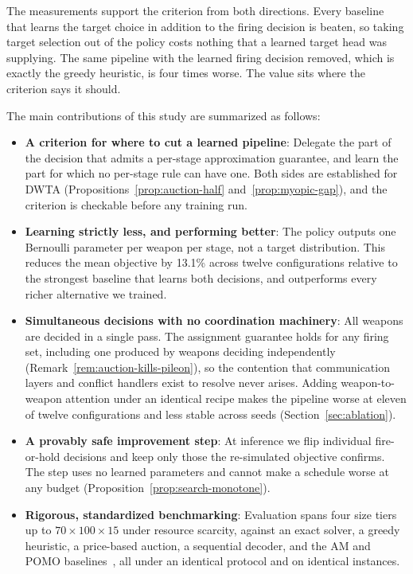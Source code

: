 The measurements support the criterion from both directions. Every baseline
that learns the target choice in addition to the firing decision is beaten, so
taking target selection out of the policy costs nothing that a learned target
head was supplying. The same pipeline with the learned firing decision
removed, which is exactly the greedy heuristic, is four times worse. The value
sits where the criterion says it should.

The main contributions of this study are summarized as follows:

\begin{itemize}
\item \textbf{A criterion for where to cut a learned pipeline}: Delegate the
part of the decision that admits a per-stage approximation guarantee, and
learn the part for which no per-stage rule can have one. Both sides are
established for DWTA (Propositions~\ref{prop:auction-half}
and~\ref{prop:myopic-gap}), and the criterion is checkable before any training
run.

\item \textbf{Learning strictly less, and performing better}: The policy
outputs one Bernoulli parameter per weapon per stage, not a target
distribution. This reduces the mean objective by 13.1\% across twelve
configurations relative to the strongest baseline that learns both decisions,
and outperforms every richer alternative we trained.

\item \textbf{Simultaneous decisions with no coordination machinery}: All
weapons are decided in a single pass. The assignment guarantee holds for any
firing set, including one produced by weapons deciding independently
(Remark~\ref{rem:auction-kills-pileon}), so the contention that communication
layers and conflict handlers exist to resolve never arises. Adding
weapon-to-weapon attention under an identical recipe makes the pipeline worse
at eleven of twelve configurations and less stable across seeds
(Section~\ref{sec:ablation}).

\item \textbf{A provably safe improvement step}: At inference we flip
individual fire-or-hold decisions and keep only those the re-simulated
objective confirms. The step uses no learned parameters and cannot make a
schedule worse at any budget (Proposition~\ref{prop:search-monotone}).

\item \textbf{Rigorous, standardized benchmarking}: Evaluation spans four
size tiers up to $70\times100\times15$ under resource scarcity, against an
exact solver, a greedy heuristic, a price-based auction, a sequential decoder,
and the AM and POMO baselines~\cite{kool2018attention,kwon2020pomo}, all under
an identical protocol and on identical instances.
\end{itemize}
